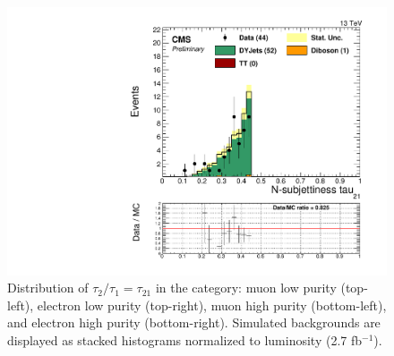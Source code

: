 \begin{figure}[h]
\begin{center}
\includegraphics[scale=0.37]{figures/control/tau21EHP.pdf}
\caption[Distribution of $\tau_{2}/\tau_{1}=\tau_{21}$]{Distribution of $\tau_{2}/\tau_{1}=\tau_{21}$ in the category: muon low purity (top-left), electron low purity (top-right), muon high purity (bottom-left), and  electron high purity (bottom-right). Simulated backgrounds are displayed as stacked histograms normalized to luminosity (2.7 fb$^{-1}$).}
\label{tau21_VZ}
\end{center}
\end{figure}

